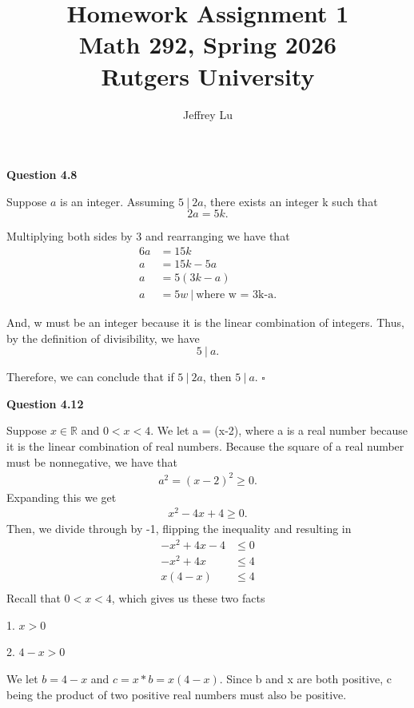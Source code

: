 \documentclass[12pt]{article}
\title{Homework Assignment 1 \\ \large Math 292, Spring 2026 \\ Rutgers University}
\author{Jeffrey Lu}
\begin{document}
\maketitle

\noindent \textbf{Question 4.8}

Suppose $a$ is an integer. Assuming $5 ~|~ 2a$, there exists an integer k such that
\[
    2a = 5k.
\]

Multiplying both sides by 3 and rearranging we have that
\begin{align*}
    6a & = 15k                           \\
    a  & = 15k -5a                       \\
    a  & = 5(3k-a)                       \\
    a  & = 5w ~|~ \text{where w = 3k-a.}
\end{align*}

And, w must be an integer because it is the linear combination of integers.
Thus, by the definition of divisibility, we have
\[
    5 ~|~ a.
\]

Therefore, we can conclude that if $ 5 ~|~ 2a$, then $5 ~|~ a$. $\square{}$

\vspace{50pt}

\noindent \textbf{Question 4.12}

Suppose $x \in{\mathbb{R}}$ and $0 < x < 4$.
We let a = (x-2), where a is a real number because it is the linear combination of real numbers.
Because the square of a real number must be nonnegative, we have that
\begin{align*}
    a^2 = (x-2)^2 \geq{0}.
\end{align*}
Expanding this we get
\begin{align*}
    x^2-4x+4 \geq{0}.
\end{align*}
Then, we divide through by -1, flipping the inequality and resulting in
\begin{align*}
    -x^2+4x-4 & \leq{0} \\
    -x^2+4x   & \leq{4} \\
    x(4-x)    & \leq{4} \\
\end{align*}
Recall that $0<x<4$, which gives us these two facts

1. $x > 0$

2. $4 - x > 0$

\noindent We let $b = 4-x$ and $c = x*b = x(4-x)$. Since b and x are both positive, c being the product of two positive real numbers must also be positive.
\end{document}
